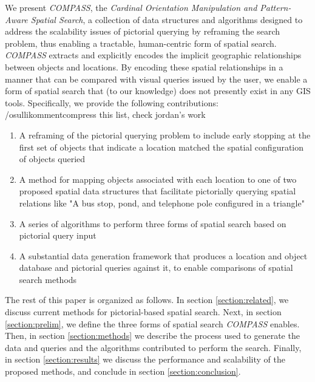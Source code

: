 \par{We present \emph{COMPASS}, the \textit{Cardinal Orientation Manipulation and Pattern-Aware Spatial Search}, a collection of data structures and algorithms designed to address the scalability issues of pictorial querying by reframing the search problem, thus enabling a tractable, human-centric form of spatial search. 
\emph{COMPASS} extracts and explicitly encodes the implicit geographic relationships between objects and locations. 
By encoding these spatial relationships in a manner that can be compared with visual queries issued by the user, we enable a form of spatial search that (to our knowledge) does not presently exist in any GIS tools.
Specifically, we provide the following contributions:
/osullikomment{compress this list, check jordan's work}
\begin{enumerate}
    \item A reframing of the pictorial querying problem to include early stopping at the first set of objects that indicate a location matched the spatial configuration of objects queried
    \item A method for mapping objects associated with each location to one of two proposed spatial data structures that facilitate pictorially querying spatial relations like "A bus stop, pond, and telephone pole configured in a triangle"
    \item A series of algorithms to perform three forms of spatial search based on pictorial query input
    \item A substantial data generation framework that produces a location and object database and pictorial queries against it, to enable comparisons of spatial search methods
\end{enumerate}

The rest of this paper is organized as follows.  In section \ref{section:related}, we discuss current methods for pictorial-based spatial search. 
Next, in section \ref{section:prelim}, we define the three forms of spatial search \emph{COMPASS} enables.
Then, in section \ref{section:methods} we describe the process used to generate the data and queries and the algorithms contributed to perform the search.
Finally, in section \ref{section:results} we discuss the performance and scalability of the proposed methods, and conclude in section \ref{section:conclusion}.
}



